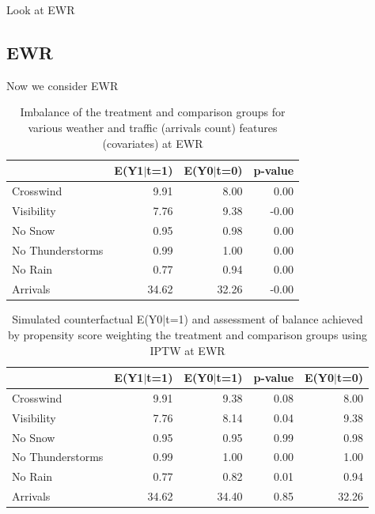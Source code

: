 \documentclass[11pt]{scrartcl}
\begin{document}
Look at EWR

\newpage\noindent
\subsection*{EWR}
Now we consider EWR
\begin{table}[ht!]
\centering
\begin{tabular}{lrrr}
  \hline
 & E(Y1$|$t=1) & E(Y0$|$t=0) & p-value \\ 
  \hline
Crosswind & 9.91 & 8.00 & 0.00 \\ 
Visibility & 7.76 & 9.38 & -0.00 \\ 
No Snow & 0.95 & 0.98 & 0.00 \\ 
No Thunderstorms & 0.99 & 1.00 & 0.00 \\ 
No Rain & 0.77 & 0.94 & 0.00 \\ 
Arrivals & 34.62 & 32.26 & -0.00 \\ 
   \hline
\end{tabular}
\caption{Imbalance of the treatment and comparison groups for various weather and traffic (arrivals count) features (covariates) at EWR} 
\label{tab:imbalance}
\end{table}

\begin{table}[ht!]
\centering
\begin{tabular}{lrrrr}
  \hline
 & E(Y1$|$t=1) & E(Y0$|$t=1) & p-value & E(Y0$|$t=0) \\ 
  \hline
Crosswind & 9.91 & 9.38 & 0.08 & 8.00 \\ 
Visibility & 7.76 & 8.14 & 0.04 & 9.38 \\ 
No Snow & 0.95 & 0.95 & 0.99 & 0.98 \\ 
No Thunderstorms & 0.99 & 1.00 & 0.00 & 1.00 \\ 
No Rain & 0.77 & 0.82 & 0.01 & 0.94 \\ 
Arrivals & 34.62 & 34.40 & 0.85 & 32.26 \\ 
   \hline
\end{tabular}
\caption{Simulated counterfactual E(Y0|t=1) and assessment of balance achieved by propensity score weighting the treatment and comparison groups using IPTW at EWR} 
\label{tab:balance}
\end{table}


\newpage\noindent



\end{document}
